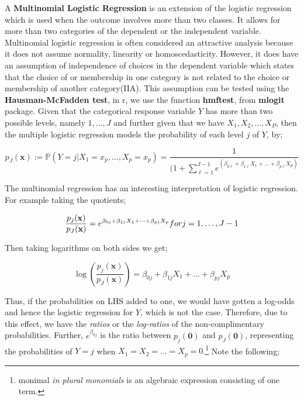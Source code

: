 \documentclass[
]{article}
\begin{document}
A \textbf{Multinomial Logistic Regression} is an extension of the
logistic regression which is used when the outcome involves more than
two classes. It allows for more than two categories of the dependent or
the independent variable. Multinomial logistic regression is often
considered an attractive analysis because it does not assume normality,
linearity or homoscedasticity. However, it does have an assumption of
independence of choices in the dependent variable which states that the
choice of or membership in one category is not related to the choice or
membership of another category(IIA). This assumption can be tested using
the \textbf{Hausman-McFadden test}, in r, we use the function
\textbf{hmftest}, from \textbf{mlogit} package. Given that the
categorical response variable \(Y\) has more than two possible levels,
namely \({1,\dots,J}\) and further given that we have
\(X_1,X_2,\dots,X_P\), then the multiple logistic regression models the
probability of each level \(j\) of \(Y\), by;

\[p_J(\mathbf{x}):=\mathbb{P}(Y=j|X_1=x_p,\dots,X_p=x_p)=\frac{1}{(1+\sum_{\ell=1}^{J-1}e^{(\beta_{0\ell}+\beta_{1\ell}X_1+\dots+\beta_{p\ell}X_p)}}\]

The multinomial regression has an interesting interpretation of logistic
regression. For example taking the quotients;

\[\frac{p_j(\mathbf{x})}{p_J(\mathbf{x})}= e^{\beta_{0j}+\beta_{1j}X_1+\dots+\beta_{pj}X_p}\space for\space j=1,\dots,J-1\]

Then taking logarithms on both sides we get;

\[\log{(\frac{p_j(\mathbf{x})}{p_J(\mathbf{x})})}=\beta_{0j}+\beta_{1j}X_1+\dots+\beta_{pj}X_p\]

Thus, if the probabilities on LHS added to one, we would have gotten a
log-odds and hence the logistic regression for \(Y\), which is not the
case. Therefore, due to this effect, we have the \emph{ratios} or the
\emph{log-ratios} of the non-complimentary probabilities. Further,
\(e^{\beta_{0j}}\) is the ratio between \(p_j(\mathbf{0})\) and
\(p_J(\mathbf{0})\), representing the probabilities of \(Y=j\) when
\(X_1=X_2=\dots=X_p=0\).\footnote{monimal \emph{in plural monomials} is
  an algebraic expression consisting of one term.} Note the following;
\end{document}
